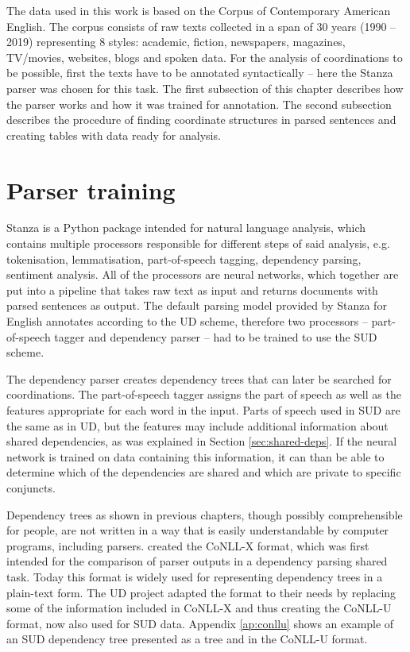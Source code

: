 The data used in this work is based on the Corpus of Contemporary American English. The corpus consists of raw texts collected in a span of 30 years (1990 -- 2019) representing 8 styles: academic, fiction, newspapers, magazines, TV/movies, websites, blogs and spoken data. For the analysis of coordinations to be possible, first the texts have to be annotated syntactically -- here the Stanza parser \citep{qi2020stanza} was chosen for this task. The first subsection of this chapter describes how the parser works and how it was trained for annotation. The second subsection describes the procedure of finding coordinate structures in parsed sentences and creating tables with data ready for analysis. 

\section{Parser training}
Stanza is a Python package intended for natural language analysis, which contains multiple processors responsible for different steps of said analysis, e.g. tokenisation, lemmatisation, part-of-speech tagging, dependency parsing, sentiment analysis. All of the processors are neural networks, which together are put into a pipeline that takes raw text as input and returns documents with parsed sentences as output. The default parsing model provided by Stanza for English annotates according to the UD scheme, therefore two processors -- part-of-speech tagger and dependency parser -- had to be trained to use the SUD scheme.

The dependency parser creates dependency trees that can later be searched for coordinations. The part-of-speech tagger assigns the part of speech as well as the features appropriate for each word in the input. Parts of speech used in SUD are the same as in UD, but the features may include additional information about shared dependencies, as was explained in Section \ref{sec:shared-deps}. If the neural network is trained on data containing this information, it can than be able to determine which of the dependencies are shared and which are private to specific conjuncts. 

Dependency trees as shown in previous chapters, though possibly comprehensible for people, are not written in a way that is easily understandable by computer programs, including parsers. \cite{buchholz-marsi-2006-conll} created the CoNLL-X format, which was first intended for the comparison of parser outputs in a dependency parsing shared task. Today this format is widely used for representing dependency trees in a plain-text form. The UD project adapted the format to their needs by replacing some of the information included in CoNLL-X and thus creating the CoNLL-U format, now also used for SUD data. Appendix \ref{ap:conllu} shows an example of an SUD dependency tree presented as a tree and in the CoNLL-U format.

